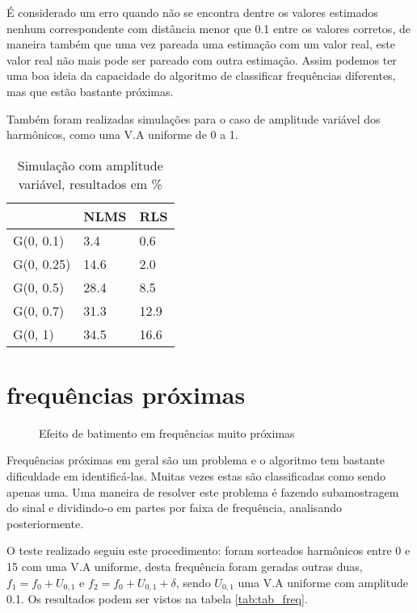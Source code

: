 \indent É considerado um erro quando não se encontra dentre os valores estimados nenhum correspondente com distância menor que 0.1 entre os valores corretos, de maneira também que uma vez pareada uma estimação com um valor real, este valor real não mais pode ser pareado com outra estimação. Assim podemos ter uma boa ideia da capacidade do algoritmo de classificar frequências diferentes, mas que estão bastante próximas.

\indent Também foram realizadas simulações para o caso de amplitude variável dos harmônicos, como uma V.A uniforme de 0 a 1.

\begin{table}[H]
	\centering
	\begin{tabular}{l|l|l}
		& NLMS & RLS \\
		\hline 
		G(0, 0.1)  & 3.4    & 0.6 \\
		G(0, 0.25) & 14.6   & 2.0  \\
		G(0, 0.5)  & 28.4  & 8.5  \\
		G(0, 0.7)  & 31.3  & 12.9  \\
		G(0, 1)    & 34.5  & 16.6 \\ 
	\end{tabular}
\caption{Simulação com amplitude variável, resultados em \%}
\end{table}

\section{frequências próximas}

\begin{figure}[h]
	\centering    
	\def\svgwidth{\columnwidth}
	
	\caption{Efeito de batimento em frequências muito próximas}
	\label{fig:your image label}
\end{figure}

\indent Frequências próximas em geral são um problema e o algoritmo tem bastante dificuldade em identificá-las. Muitas vezes estas são classificadas como sendo apenas uma. Uma maneira de resolver este problema é fazendo subamostragem do sinal e dividindo-o em partes por faixa de frequência, analisando posteriormente.

\indent O teste realizado seguiu este procedimento: foram sorteados harmônicos entre 0 e 15 com uma V.A uniforme, desta frequência foram geradas outras duas, $f_1=f_0+U_{0,1}$ e $f_2=f_0+U_{0,1}+\delta$, sendo $U_{0,1}$ uma V.A uniforme com amplitude 0.1. Os resultados podem ser vistos na tabela \ref{tab:tab_freq}.

